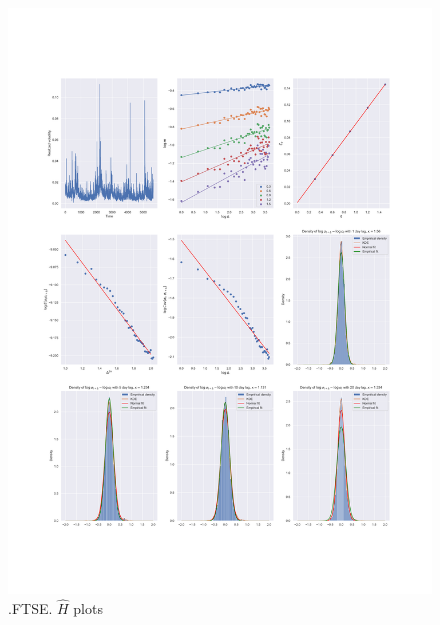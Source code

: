 	\begin{figure}[h]
		\centering
		\includegraphics[width=\linewidth]{fig/.FTSE.pdf}
		\caption{.FTSE. $\hat{H}$ plots}
	\end{figure}

